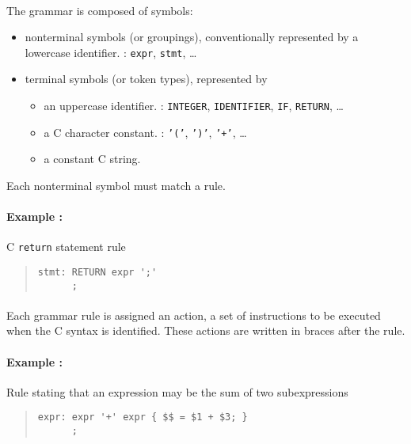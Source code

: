 \paragraph{}
The grammar is composed of symbols:
\begin{itemize}
\item nonterminal symbols (or groupings), conventionally represented by a lowercase identifier. \eg{} : \texttt{expr}, \texttt{stmt}, \ldots
\item terminal symbols (or token types), represented by
  \begin{itemize}
  \item an uppercase identifier. \eg{} : \texttt{INTEGER}, \texttt{IDENTIFIER}, \texttt{IF}, \texttt{RETURN}, \ldots
  \item a C character constant. \eg{} : \texttt{'('}, \texttt{')'}, \texttt{'+'}, \ldots
  \item a constant C string.
  \end{itemize}
\end{itemize}

Each nonterminal symbol must match a rule.

\paragraph{Example :} C \texttt{return} statement rule
\begin{quote}
\begin{verbatim}
stmt: RETURN expr ';'
      ;
\end{verbatim}
\end{quote}

\paragraph{}
Each grammar rule is assigned an action, \ie{} a set of instructions to be executed when the C syntax is identified. These actions are written in braces after the rule.

\paragraph{Example :} Rule stating that an expression may be the sum of two subexpressions
\begin{quote}
\begin{verbatim}
expr: expr '+' expr { $$ = $1 + $3; }
      ;
\end{verbatim}
\end{quote}

